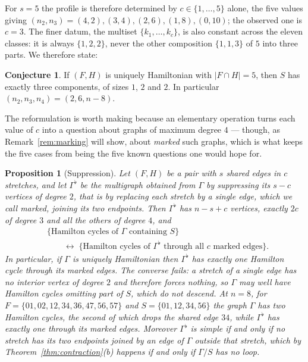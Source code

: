 \documentclass[11pt,a4paper]{article}
\newtheorem{proposition}[theorem]{Proposition}
\theoremstyle{definition}
\newtheorem{conjecture}[theorem]{Conjecture}
\theoremstyle{remark}
\begin{document}
For $s=5$ the profile is therefore determined by $c\in\{1,\dots,5\}$ alone, the five values giving $(n_2,n_3)=(4,2),(3,4),(2,6),(1,8),(0,10)$; the observed one is $c=3$. The finer datum, the multiset $\{k_1,\dots,k_c\}$, is also constant across the eleven classes: it is always $\{1,2,2\}$, never the other composition $\{1,1,3\}$ of $5$ into three parts. We therefore state:

\begin{conjecture}\label{conj:profile}
If $(F,H)$ is uniquely Hamiltonian with $|F\cap H|=5$, then $S$ has exactly three components, of sizes $1$, $2$ and $2$. In particular $(n_2,n_3,n_4)=(2,6,n-8)$.
\end{conjecture}

The reformulation is worth making because an elementary operation turns each value of $c$ into a question about graphs of maximum degree $4$ --- though, as Remark~\ref{rem:marking} will show, about \emph{marked} such graphs, which is what keeps the five cases from being the five known questions one would hope for.

\begin{proposition}[Suppression]\label{prop:suppress}
Let $(F,H)$ be a pair with $s$ shared edges in $c$ stretches, and let $\Gamma^{\flat}$ be the multigraph obtained from $\Gamma$ by suppressing its $s-c$ vertices of degree $2$, that is by replacing each stretch by a single edge, which we call \emph{marked}, joining its two endpoints. Then $\Gamma^{\flat}$ has $n-s+c$ vertices, exactly $2c$ of degree $3$ and all the others of degree $4$, and
\[
\begin{aligned}
&\{\text{Hamilton cycles of }\Gamma\text{ containing }S\}\\
&\qquad\longleftrightarrow\;\{\text{Hamilton cycles of }\Gamma^{\flat}\text{ through all }c\text{ marked edges}\}.
\end{aligned}
\]
In particular, if $\Gamma$ is uniquely Hamiltonian then $\Gamma^{\flat}$ has exactly one Hamilton cycle through its marked edges. The converse fails: a stretch of a single edge has no interior vertex of degree $2$ and therefore forces nothing, so $\Gamma$ may well have Hamilton cycles omitting part of $S$, which do not descend. At $n=8$, for $F=\{01,02,12,34,36,47,56,57\}$ and $S=\{01,12,34,56\}$ the graph $\Gamma$ has two Hamilton cycles, the second of which drops the shared edge $34$, while $\Gamma^{\flat}$ has exactly one through its marked edges. Moreover $\Gamma^{\flat}$ is simple if and only if no stretch has its two endpoints joined by an edge of $\Gamma$ outside that stretch, which by Theorem~\ref{thm:contraction}(b) happens if and only if $\Gamma/S$ has no loop.
\end{proposition}
\end{document}
